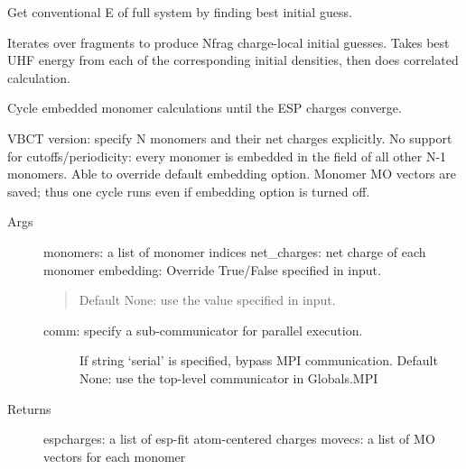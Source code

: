 \documentclass[letterpaper,10pt,english]{sphinxmanual}
\begin{document}
\begin{fulllineitems}
\label{\detokenize{vbct:vbct.monomerscf.fullsys_best_guess}}
Get conventional E of full system by finding best initial guess.

Iterates over fragments to produce Nfrag charge-local initial guesses.
Takes best UHF energy from each of the corresponding initial densities, then
does correlated calculation.

\end{fulllineitems}


\begin{fulllineitems}
\label{\detokenize{vbct:vbct.monomerscf.monomerSCF}}
Cycle embedded monomer calculations until the ESP charges converge.

VBCT version: specify N monomers and their net charges
explicitly.  No support for cutoffs/periodicity: every monomer is
embedded in the field of all other N-1 monomers. Able to override default
embedding option. Monomer MO vectors are saved; thus one cycle runs even
if embedding option is turned off.
\begin{description}
\item[{Args}] \leavevmode
monomers: a list of monomer indices
net\_charges: net charge of each monomer
embedding: Override True/False specified in input.
\begin{quote}

Default None: use the value specified in input.
\end{quote}
\begin{description}
\item[{comm: specify a sub-communicator for parallel execution.}] \leavevmode
If string `serial' is specified, bypass MPI communication.
Default None: use the top-level communicator in Globals.MPI

\end{description}

\item[{Returns}] \leavevmode
espcharges: a list of esp-fit atom-centered charges
movecs: a list of MO vectors for each monomer

\end{description}

\end{fulllineitems}
\end{document}
